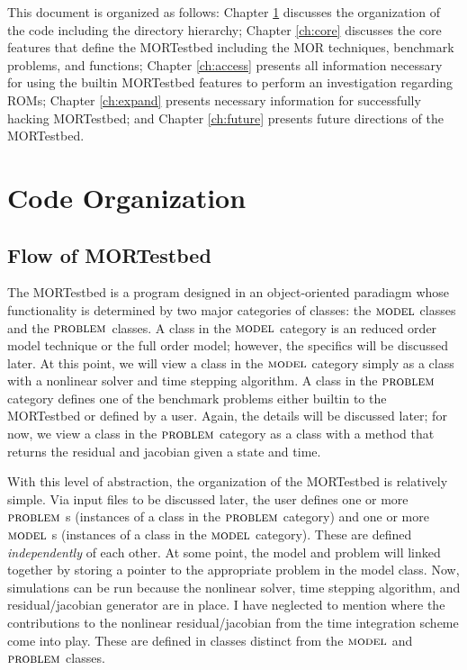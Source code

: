 \documentclass[notitlepage]{report}
\newcommand{\model}{\ensuremath{\textsc{model }}}
\newcommand{\problem}{\ensuremath{\textsc{problem }}}
\begin{document}
This document is organized as follows: Chapter \ref{ch:codeorg} discusses the organization of the code including the directory hierarchy; Chapter \ref{ch:core} discusses the core features that define the MORTestbed including the MOR techniques, benchmark problems, and functions; Chapter \ref{ch:access} presents all information necessary for using the builtin MORTestbed features to perform an investigation regarding ROMs; Chapter \ref{ch:expand} presents necessary information for successfully hacking MORTestbed; and Chapter \ref{ch:future} presents future directions of the MORTestbed. 


\chapter{Code Organization} \label{ch:codeorg}
\section{Flow of MORTestbed}
The MORTestbed is a program designed in an object-oriented paradiagm whose functionality is determined by two major categories of classes: the \model classes and the \problem classes.  A class in the \model category is an reduced order model technique or the full order model; however, the specifics will be discussed later.  At this point, we will view a class in the \model category simply as a class with a nonlinear solver and time stepping algorithm.  A class in the \problem category defines one of the benchmark problems either builtin to the MORTestbed or defined by a user.  Again, the details will be discussed later; for now, we view a class in the \problem category as a class with a method that returns the residual and jacobian given a state and time.

With this level of abstraction, the organization of the MORTestbed is relatively simple.  Via input files to be discussed later, the user defines one or more \problem s (instances of a class in the \problem category) and one or more \model s (instances of a class in the \model category).  These are defined \emph{independently} of each other.  At some point, the model and problem will linked together by storing a pointer to the appropriate problem in the model class.  Now, simulations can be run because the nonlinear solver, time stepping algorithm, and residual/jacobian generator are in place.  I have neglected to mention where the contributions to the nonlinear residual/jacobian from the time integration scheme come into play.  These are defined in classes distinct from the \model and \problem classes. 
\end{document}
